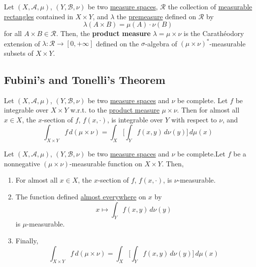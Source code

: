   \begin{definition}
    \label{def:product-measure}
    Let $(X, \mathcal{A}, \mu)$, $(Y, \mathcal{B}, \nu)$ be two \hyperref[def:measure-space]{measure spaces}, $\mathcal{R}$ the collection of \hyperref[def:measurable-rectangle]{measurable rectangles} contained in $X \times Y$, and $\lambda$ the \hyperref[def:premeasure]{premeasure} defined on $\mathcal{R}$ by 
    \begin{equation}
      \lambda(A \times B) = \mu(A) \cdot \nu(B)
    \end{equation}
    for all $A \times B \in \mathcal{R}$. Then, the \textbf{product measure} $\lambda = \mu \times \nu$ is the Carathéodory extension of $\lambda: \mathcal{R} \to [0, +\infty]$ defined on the $\sigma$-algebra of $(\mu \times \nu)^\ast$-measurable subsets of $X \times Y$. 
  \end{definition}

\subsection{Fubini's and Tonelli's Theorem}

  \begin{theorem}
    \label{thm:fubinis-theorem}
    Let $(X, \mathcal{A}, \mu)$, $(Y, \mathcal{B}, \nu)$ be two \hyperref[def:measure-space]{measure spaces} and $\nu$ be complete. Let $f$ be integrable over $X \times Y$ w.r.t. to the \hyperref[def:product-measure]{product measure} $\mu \times \nu$. Then for almost all $x \in X$, the $x$-section of $f$, $f(x, \cdot)$, is integrable over $Y$ with respect to $\nu$, and 
    \begin{equation}
      \int_{X \times Y} f \, d(\mu \times \nu) = \int_X \bigg[ \int_Y f(x, y) \,d\nu(y) \bigg] \, d\mu(x)
    \end{equation}
  \end{theorem}

  \begin{theorem}
    \label{thm:tonellis-theorem}
    Let $(X, \mathcal{A}, \mu)$, $(Y, \mathcal{B}, \nu)$ be two \hyperref[def:measure-space]{measure spaces} and $\nu$ be complete.Let $f$ be a nonnegative $(\mu \times \nu)$-measurable function on $X \times Y$. Then, 
    \begin{enumerate}
      \item For almost all $x \in X$, the $x$-section of $f$, $f(x, \cdot)$, is $\nu$-measurable. 
      \item The function defined \hyperref[def:almost_everywhere]{almost everywhere} on $x$ by 
        \begin{equation}
          x \mapsto \int_Y f(x, y) \,d\nu(y)
        \end{equation}
        is $\mu$-measurable. 
      \item Finally, 
        \begin{equation}
          \int_{X \times Y} f \,d(\mu \times \nu) = \int_X \bigg[ \int_Y f(x, y) \,d\nu(y) \bigg] \,d \mu(x)
        \end{equation}
    \end{enumerate}
  \end{theorem}

